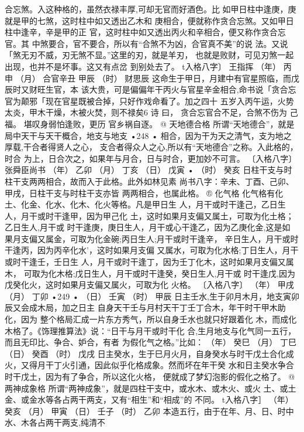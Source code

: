 合忘煞。入这种格的，虽然衣禄丰厚,可却无官而好酒色。比
如甲日柱中逢庚，庚就是甲的七煞，这时柱中如又透出乙木和
庚相合，便就称作贪合忘煞。又如甲日柱中逢辛，辛是甲的正
官，这时柱中如又透出丙火和辛相合，便又称作贪合忘官。其
中煞要合，官不要合，所以有“合煞不为凶，合官真不美”的说
法。又说「煞无刃不威，刃无煞不显。”这里的刃，就是羊刃，
也就是败财，可见刃煞一起出现，也并不是坏事。这又有点岔
到别处去了。
t入格八字〕 王指挥
（年） 丙申
（月） 合官辛丑
甲辰
（时） 财思辰
这命生于甲日，月建中有官星照临，而戊辰时又财旺生官，本
该大贵，可是偏偏年干丙火与官星辛金相合,命书说「贪合忘
官为颠邪「现在官星既被合掉，只好作戏命看了。加之四十
五岁入丙午运，火势太炎，甲木干燥，木被火焚，则不禄矣6 诗
曰，
贪合忘官合不足，合煞不伤为 己福。
堪叹身弱怕逢败，更历 官乡祸自逐。
@ 天地德合格
所谓“天地德合”，就是局中天干与天干概合，地支与地支
•248 •
相合，因为干为天之清气，支为地之厚载,干合者得贤人之心，
支合者得众人之心,所以有“天地德合”之称。入此格的，时合
为上，日合次之，如果年与月合，日与时合，更加妙不可言。
〔入格八字〕 张舜臣尚书
（年） 乙卯
（月） 丁亥
（日） 戊寅 •
（时） 癸亥
日柱干支与时柱干支两两相合，故而入于此格。此外如林见素
尚书八字：辛未、丁酉、己卯、甲戌，日柱干支与时柱干支亦皆
两两相合，也属此格。
® 化气格
化气格有化土、化金、化水、化木、化火等格。凡是甲日生
人，月干或时干逢己，乙日生人，月干或时干逢甲，因为甲己化
土，这时如果月支偏又属土，可取为化土格；乙日生人,月干或
时干逢庚，庚日生人，月干或心干逢乙，因为乙庚化金,这是如
果月支偏又属金，可取为化金碗;丙日生人;月干或时干逢辛，
辛日生人，月干或时干逢丙，因为丙辛化水'，这时如果月支偏
又属水，可取为化水格;丁日生人，月干或时干逢壬，壬日生
人，月干或时干逢丁，因为壬丁化木，这时如果月支偏又属木，
可取为化木格;戊日生人，月干或时干逢癸，癸日生人,月干或
时干逢戊,因为戊癸化火，这时如果月支偏又属火，可取为化
火格。
〔入格八字〕
（年） 甲戌
（月） 丁卯
•249 •
（日） 壬寅
（时） 甲辰
日主壬水,生于卯月木月，地支寅卯辰又会成木局，加之日主
自身天干壬与月村天干丁壬丁合木，年干时干甲木助化，因为
整个格局汇成一片东方秀气，所以自身壬水也就只好跟着化
木，而成化木格了。《饰理推算法》说：“日干与月干或时干化
合,生月地支与化气同一五行，而且无印比、争合、妒合，有者
为假化气之格。”比如：
（年） 癸巳
（月） 丁巳
（日） 癸酉
（时） 戊戌
日主癸水，生于巳月火月，自身癸水与时干戊土合化成
火，又得月干丁火引通，因此似乎化格成象。然而坏在年干癸
水和日主癸水争合时干戊土，因为有了争合，所以这化火格，
便就成了梦幻泡影的假化之格了。
@ 两神成象格
所谓“两神成象”，就是四柱干支中，或水木、或木火、或火
土、或土金、或金水等各占两干两支，又有“相生”和“相成”的
不同。
t入格八字］
（年） 癸亥
（月） 甲寅
（日） 壬子
（时） 乙卯
本造五行，由于在年、月、日、时中水、木各占两干两支,纯清不
